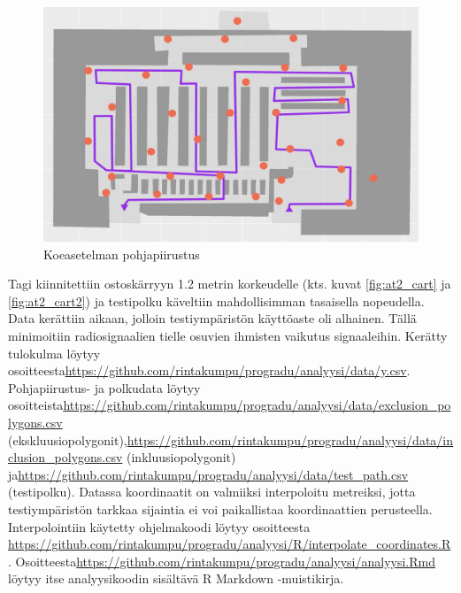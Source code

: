 \documentclass[
  12pt,
  a4paper, twoside]{book}
\begin{document}
\begin{figure}[H]
\centering
\includegraphics[width=15cm]{testipolku_numeroimaton}
\caption{Koeasetelman pohjapiirustus}
\label{fig:testipolku}
\end{figure}

\noindent Tagi kiinnitettiin ostoskärryyn 1.2 metrin korkeudelle (kts. kuvat \ref{fig:at2_cart} ja \ref{fig:at2_cart2}) ja testipolku käveltiin mahdollisimman tasaisella nopeudella. Data kerättiin aikaan, jolloin testiympäristön käyttöaste oli alhainen. Tällä minimoitiin radiosignaalien tielle osuvien ihmisten vaikutus signaaleihin. Kerätty tulokulma löytyy osoitteesta\newline \url{https://github.com/rintakumpu/progradu/analyysi/data/y.csv}. Pohjapiirustus- ja polkudata löytyy osoitteista\newline \url{https://github.com/rintakumpu/progradu/analyysi/data/exclusion_polygons.csv} (ekskluusiopolygonit),\newline \url{https://github.com/rintakumpu/progradu/analyysi/data/inclusion_polygons.csv} (inkluusiopolygonit) ja\newline \url{https://github.com/rintakumpu/progradu/analyysi/data/test_path.csv} (testipolku). Datassa koordinaatit on valmiiksi interpoloitu metreiksi, jotta testiympäristön tarkkaa sijaintia ei voi paikallistaa koordinaattien perusteella. Interpolointiin käytetty ohjelmakoodi löytyy osoitteesta \newline \url{https://github.com/rintakumpu/progradu/analyysi/R/interpolate_coordinates.R} . Osoitteesta\newline \url{https://github.com/rintakumpu/progradu/analyysi/analyysi.Rmd} löytyy itse analyysikoodin sisältävä R Markdown -muistikirja.
\end{document}
